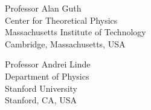 \documentclass[7x10]{NewMath_MIT}
\begin{document}


\mainmatter











\backmatter
{}



\theendnotes

\let\bibname\refname
\printbibliography

\begin{contributors}[twocolumn]

\contrib
Professor Alan Guth\\
Center for Theoretical Physics\\
Massachusetts Institute of Technology\\
Cambridge, Massachusetts, USA

\contrib
Professor Andrei Linde\\
Department of Physics\\
Stanford University\\
Stanford, CA, USA
\end{contributors}

\printindex
\end{document}
